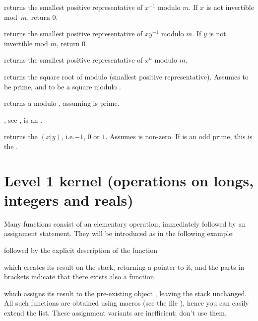  returns the smallest
positive representative of $x^{-1}$ modulo $m$. If $x$ is not invertible
mod~$m$, return $0$.

 returns the smallest
positive representative of $x y^{-1}$ modulo $m$. If $y$ is not invertible
mod $m$, return $0$.

 returns the smallest
positive representative of $x^n$ modulo $m$.

 returns the square root of 
modulo  (smallest positive representative). Assumes  to be
prime, and  to be a square modulo .

 returns a  modulo ,
assuming  is prime.

, see ,
 is an .

 returns the 
$(x|y)$, i.e.$-1$, $0$ or $1$. Assumes  is non-zero. If  is an
odd prime, this is the .

\section{Level 1 kernel (operations on longs, integers and reals)}

 Many functions consist of an elementary operation,
immediately followed by an assignment statement. They will be introduced as
in the following example:

 followed by the explicit
description of the function


\noindent which creates its result on the stack, returning a  pointer
to it, and the parts in brackets indicate that there exists also a function


\noindent which assigns its result to the pre-existing object
, leaving the stack unchanged. All such functions are obtained using
macros (see the file ), hence you can easily extend the list.
These assignment variants are inefficient; don't use them.


